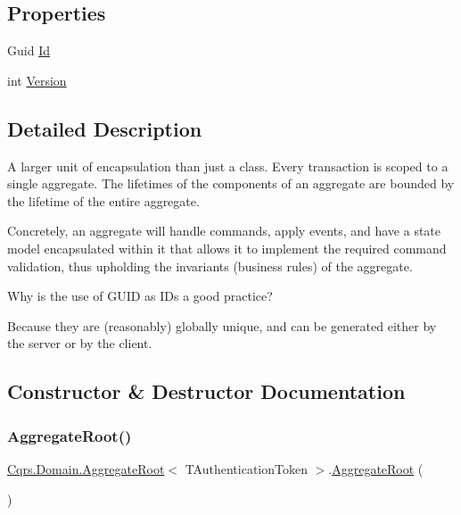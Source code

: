 \subsection*{Properties}
\begin{DoxyCompactItemize}
\item 
Guid \hyperlink{classCqrs_1_1Domain_1_1AggregateRoot_ab84d521c8c3bffd3c2e58959984d1e88}{Id}
\item 
int \hyperlink{classCqrs_1_1Domain_1_1AggregateRoot_a15f351663975c1d8e2cdc37b8c4d970f}{Version}
\end{DoxyCompactItemize}


\subsection{Detailed Description}
A larger unit of encapsulation than just a class. Every transaction is scoped to a single aggregate. The lifetimes of the components of an aggregate are bounded by the lifetime of the entire aggregate. 

Concretely, an aggregate will handle commands, apply events, and have a state model encapsulated within it that allows it to implement the required command validation, thus upholding the invariants (business rules) of the aggregate. 

Why is the use of G\+U\+ID as I\+Ds a good practice?

Because they are (reasonably) globally unique, and can be generated either by the server or by the client. 

\subsection{Constructor \& Destructor Documentation}
\mbox{\label{classCqrs_1_1Domain_1_1AggregateRoot_a1db2322dd7442e1e0c3c07332124eb2f}} 
\subsubsection{\texorpdfstring{Aggregate\+Root()}{AggregateRoot()}}
{\footnotesize\ttfamily \hyperlink{classCqrs_1_1Domain_1_1AggregateRoot}{Cqrs.\+Domain.\+Aggregate\+Root}$<$ T\+Authentication\+Token $>$.\hyperlink{classCqrs_1_1Domain_1_1AggregateRoot}{Aggregate\+Root} (\begin{DoxyParamCaption}{ }\end{DoxyParamCaption})\hspace{0.3cm}{\ttfamily [protected]}}



